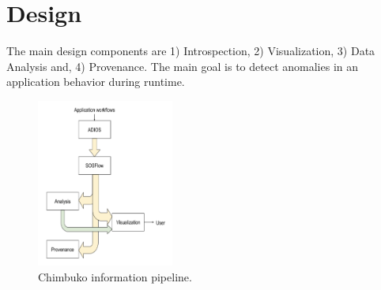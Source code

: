 \section{Design}
The main design components are 1) Introspection, 2) Visualization, 3) Data Analysis and, 4) Provenance. The main goal is to detect  anomalies in an application behavior during runtime.

\begin{figure}[th!]
 \centering
  \includegraphics[width=0.4\textwidth]{Figs/design_Y2}
 \caption{Chimbuko information pipeline.}
\label{designfig:1}     
 \end{figure}


